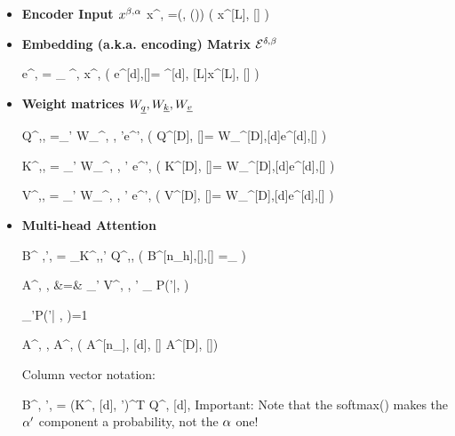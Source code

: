  
 \begin{itemize}
 
 \item {\bf Encoder Input $x^{\beta, \alpha}$}
 \beq
 x^{\beta, \alp} =\delta(\beta, \beta(\alp))
 \left(
 x^{[L], [\ell]} 
 \right)
 \eeq

\item {\bf Embedding (a.k.a. encoding) Matrix ${\cal E}^{\delta, \beta}$}

\beq
e^{\delta, \alp} = \sum_\beta 
\cale^{\delta, \beta}
x^{\beta, \alp}
\;\;
\left(
e^{[d],[\ell]}= \cale^{[d], [L]}x^{[L], [\ell]}
\right)
\eeq

\item{\bf Weight matrices $W_{\underline{q}}, W_{\underline{k}}, W_{\underline{v}}$}

\beq
Q^{\nu,\delta, \alp}=\sum_{\delta'}
W_\rvq^{\nu, \delta, \delta'}e^{\delta', \alp}
\;\;
\left(
Q^{[D], [\ell]}=
W_\rvq^{[D],[d]}e^{[d],[\ell]}
\right)
\eeq


\beq
K^{\nu,\delta, \alp}=
\sum_{\delta'}
W_\rvk^{\nu, \delta, \delta'}
e^{\delta', \alp}
\;\;
\left(
K^{[D], [\ell]}=
W_\rvk^{[D],[d]}e^{[d],[\ell]}
\right)
\eeq

\beq
V^{\nu,\delta, \alp}=
\sum_{\delta'}
W_\rvv^{\nu, \delta, \delta'}
e^{\delta', \alp}
\;\;
\left(
V^{[D], [\ell]}=
W_\rvv^{[D],[d]}e^{[d],[\ell]}
\right)
\eeq

\item {\bf Multi-head Attention}

\beq
B^{
\nu,{\alp'}, \alp}=
\sum_\delta K^{\nu,\delta,{\alp'}}
Q^{\nu,\delta,\alp}
\;\;
\left(
B^{[n_h],[\ell],[\ell]}
=_{\nu\in[n_\rvh]}
\right)
\eeq

\beqa
A^{\nu, 
\delta, \alp}&=&
\sum_{{\alp'}}
V^{\nu, \delta, {\alp'}}
_{
P({\alp'}|\alp, \nu)}
\eeqa

\beq
\sum_{{\alp'}\in [\ell]}P({\alp'}| \alp, \nu)=1
\eeq

\beq
A^{\nu, \delta, \alp}
\rarrow
A^{\Delta, \alp}
\left(
A^{[n_\rvh], [d], [\ell]}
\rarrow
A^{[D], [\ell]}\right)
\eeq

Column vector notation:

\beq
B^{\nu, {\alp'}, \alp}=
(K^{\nu, [d], {\alp'}})^T Q^{\nu, [d], \alp}
\eeq
Important: Note that the softmax() makes the
${\alpha'}$ component a probability,
not the $\alpha$ one!


\end{itemize}
